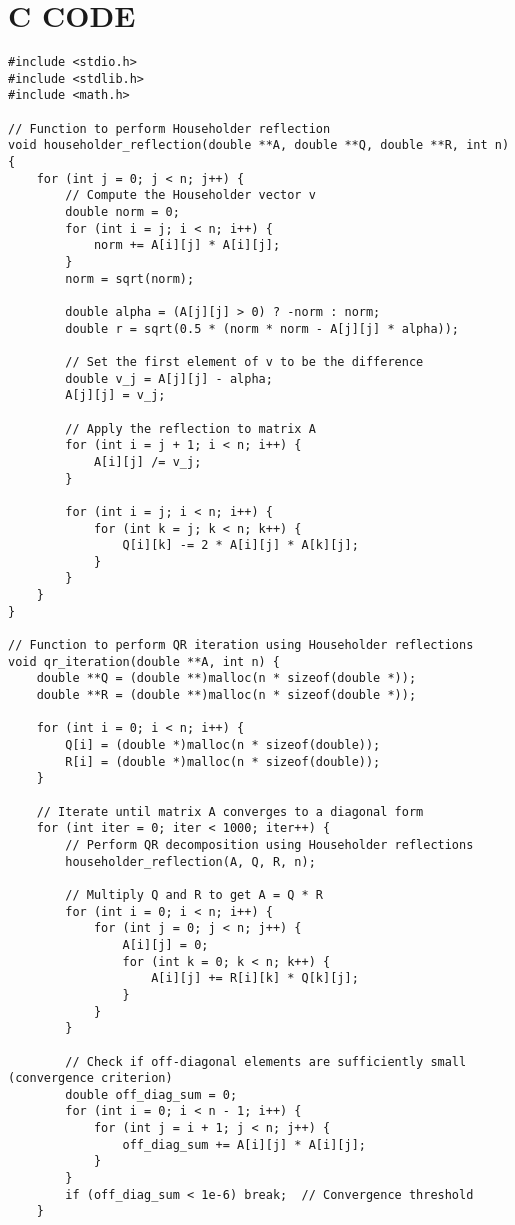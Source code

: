 \documentclass[journal]{IEEEtran}
\begin{document}
\section{\textbf{C CODE}}
\begin{lstlisting}
#include <stdio.h>
#include <stdlib.h>
#include <math.h>

// Function to perform Householder reflection
void householder_reflection(double **A, double **Q, double **R, int n) {
    for (int j = 0; j < n; j++) {
        // Compute the Householder vector v
        double norm = 0;
        for (int i = j; i < n; i++) {
            norm += A[i][j] * A[i][j];
        }
        norm = sqrt(norm);
        
        double alpha = (A[j][j] > 0) ? -norm : norm;
        double r = sqrt(0.5 * (norm * norm - A[j][j] * alpha));
        
        // Set the first element of v to be the difference
        double v_j = A[j][j] - alpha;
        A[j][j] = v_j;
        
        // Apply the reflection to matrix A
        for (int i = j + 1; i < n; i++) {
            A[i][j] /= v_j;
        }
        
        for (int i = j; i < n; i++) {
            for (int k = j; k < n; k++) {
                Q[i][k] -= 2 * A[i][j] * A[k][j];
            }
        }
    }
}

// Function to perform QR iteration using Householder reflections
void qr_iteration(double **A, int n) {
    double **Q = (double **)malloc(n * sizeof(double *));
    double **R = (double **)malloc(n * sizeof(double *));
    
    for (int i = 0; i < n; i++) {
        Q[i] = (double *)malloc(n * sizeof(double));
        R[i] = (double *)malloc(n * sizeof(double));
    }

    // Iterate until matrix A converges to a diagonal form
    for (int iter = 0; iter < 1000; iter++) {
        // Perform QR decomposition using Householder reflections
        householder_reflection(A, Q, R, n);
        
        // Multiply Q and R to get A = Q * R
        for (int i = 0; i < n; i++) {
            for (int j = 0; j < n; j++) {
                A[i][j] = 0;
                for (int k = 0; k < n; k++) {
                    A[i][j] += R[i][k] * Q[k][j];
                }
            }
        }
        
        // Check if off-diagonal elements are sufficiently small (convergence criterion)
        double off_diag_sum = 0;
        for (int i = 0; i < n - 1; i++) {
            for (int j = i + 1; j < n; j++) {
                off_diag_sum += A[i][j] * A[i][j];
            }
        }
        if (off_diag_sum < 1e-6) break;  // Convergence threshold
    }


\end{lstlisting}
\end{document}
